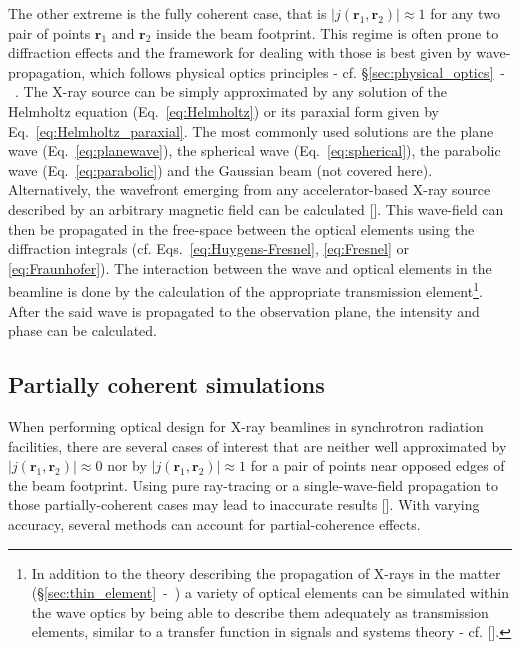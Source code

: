 \begin{refsection}
The other extreme is the fully coherent case, that is $|j(\textbf{r}_1,\textbf{r}_2)|\approx1$ for any two pair of points $\textbf{r}_1$ and $\textbf{r}_2$ inside the beam footprint. This regime is often prone to diffraction effects and the framework for dealing with those is best given by wave-propagation, which follows physical optics principles - cf. §\ref{sec:physical_optics}~-~\textit{}. The X-ray source can be simply approximated by any solution of the Helmholtz equation (Eq.~\ref{eq:Helmholtz}) or its paraxial form given by Eq.~\ref{eq:Helmholtz_paraxial}. The most commonly used solutions are the plane wave (Eq.~\ref{eq:planewave}), the spherical wave (Eq.~\ref{eq:spherical}), the parabolic wave (Eq.~\ref{eq:parabolic}) and the Gaussian beam (not covered here). Alternatively, the wavefront emerging from any accelerator-based X-ray source described by an arbitrary magnetic field can be calculated [\cite{Chubar1995, Chubar2001}]. This wave-field can then be propagated in the free-space between the optical elements using the diffraction integrals (cf. Eqs.~\ref{eq:Huygens-Fresnel},  \ref{eq:Fresnel} or \ref{eq:Fraunhofer}). The interaction between the wave and optical elements in the beamline is done by the calculation of the appropriate transmission element\footnote{In addition to the theory describing the propagation of X-rays in the matter (§\ref{sec:thin_element}~-~\textit{}) a variety of optical elements can be simulated within the wave optics by being able to describe them adequately as transmission elements, similar to a transfer function in signals and systems theory - cf. [\cite{Canestrari2014, Li2017}].}. After the said wave is propagated to the observation plane, the intensity and phase can be calculated. 

\subsection{Partially coherent simulations}\label{sec:partially_coherent}

When performing optical design for X-ray beamlines in synchrotron radiation facilities, there are several cases of interest that are neither well approximated by $|j(\textbf{r}_1,\textbf{r}_2)|\approx0$ nor by $|j(\textbf{r}_1,\textbf{r}_2)|\approx1$ for a pair of points near opposed edges of the beam footprint. Using pure ray-tracing or a single-wave-field propagation to those partially-coherent cases may lead to inaccurate results [\cite{SanchezdelRio2019}]. With varying accuracy, several methods can account for partial-coherence effects.


\end{refsection}
